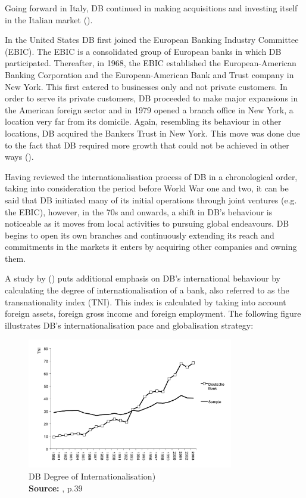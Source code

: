 \documentclass[11pt,a4paper]{article}
\newcommand*{\captionsource}[2]{%
  \caption[{#1}]{%
    #1%
    \\\hspace{\linewidth}%
    \textbf{Source:} #2%
  }%
}
\begin{document}
{{Going forward in Italy, DB continued in making acquisitions and investing itself in the Italian market (\cite{deutschebankagDeutscheBankItaly}). \par
In the United States DB first joined the European Banking Industry Committee (EBIC). The EBIC is a consolidated group of European banks in which DB participated. Thereafter, in 1968, the EBIC established the European-American Banking Corporation and the European-American Bank and Trust company in New York. This first catered to businesses only and not private customers. 
In order to serve its private customers, DB proceeded to make major expansions in the American foreign sector and in 1979 opened a branch office in New York, a location very far from its domicile. Again, resembling its behaviour in other locations, DB acquired the Bankers Trust in New York. This move was done due to the fact that DB required more growth that could not be achieved in other ways (\cite{deutschebankagDeutscheBankUS}).   \par
Having reviewed the internationalisation process of DB in a chronological order, taking into consideration the period before World War one and two, it can be said that DB initiated many of its initial operations through joint ventures (e.g. the EBIC), however, in the 70s and onwards, a shift in DB's behaviour is noticeable as it moves from local activities to pursuing global endeavours. DB begins to open its own branches and continuously extending its reach and commitments in the markets it enters by acquiring other companies and owning them. \par
A study by \citeauthor{slagerInternationalizationBanksStrategic2005} (\citeyear{slagerInternationalizationBanksStrategic2005}) puts additional emphasis on DB's international behaviour by calculating the degree of internationalisation of a bank, also referred to as the transnationality index (TNI). This index is calculated by taking into account foreign assets, foreign gross income and foreign employment. The following figure illustrates DB's internationalisation pace and globalisation strategy:

  \vspace{5mm}
\begin{figure}[H]
	\centering
  \includegraphics[width=90mm]{figures/fig_db_internationalisation}
  \vspace{5mm}
    \captionsetup{justification=centering,margin=2cm}
      \captionsource{DB Degree of Internationalisation)}{\cite{slagerInternationalizationBanksStrategic2005}, p.39}
	\label{fig:db_international}
\end{figure}

}}
\end{document}
